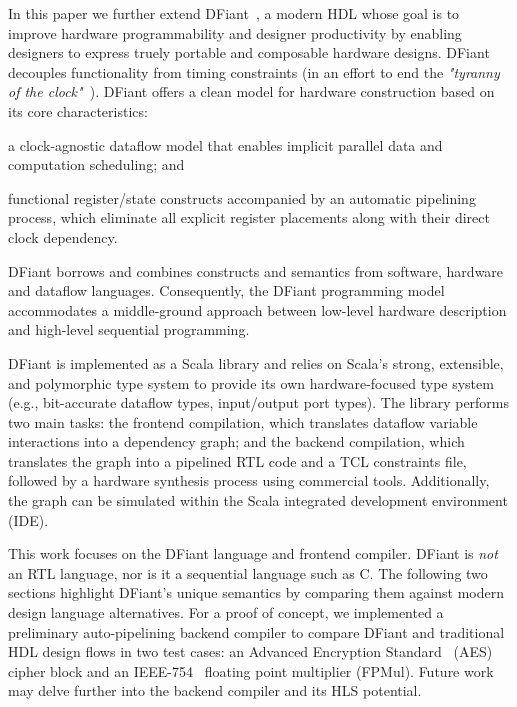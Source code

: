 
In this paper we further extend DFiant~\cite{Port2017}, a modern HDL whose goal is to improve hardware programmability and designer productivity by enabling designers to express truely portable and composable hardware designs.
DFiant decouples functionality from timing constraints (in an effort to end the \emph{"tyranny of the clock"}~\cite{Sutherland2012}). DFiant offers a clean model for hardware construction based on its core characteristics:
\begin{enumerate*}[label=(\roman*)]
\item
  a clock-agnostic dataflow model that enables implicit parallel data and computation scheduling; and
\item
  functional register/state constructs accompanied by an automatic pipelining process, which eliminate all explicit register placements along with their direct clock dependency.
\end{enumerate*} DFiant borrows and combines constructs and semantics from software, hardware and dataflow languages. Consequently, the DFiant programming model accommodates a middle-ground approach between low-level hardware description and high-level sequential programming. 

DFiant is implemented as a Scala library and relies on Scala's strong, extensible, and polymorphic type system to provide its own hardware-focused type system (e.g., bit-accurate dataflow types, input/output port types). The library performs two main tasks: the frontend compilation, which translates dataflow variable interactions into a dependency graph; and the backend compilation, which translates the graph into a pipelined RTL code and a TCL constraints file, followed by a hardware synthesis process using commercial tools. Additionally, the graph can be simulated within the Scala integrated development environment (IDE). 

This work focuses on the DFiant language and frontend compiler. DFiant is \emph{not} an RTL language, nor is it a sequential language such as C. The following two sections highlight DFiant's unique semantics by comparing them against modern design language alternatives. For a proof of concept, we implemented a preliminary auto-pipelining backend compiler to compare DFiant and traditional HDL design flows in two test cases: an Advanced Encryption Standard~\cite{pub2001197} (AES) cipher block and an IEEE-754~\cite{IEEE2008} floating point multiplier (FPMul). Future work may delve further into the backend compiler and its HLS potential.


